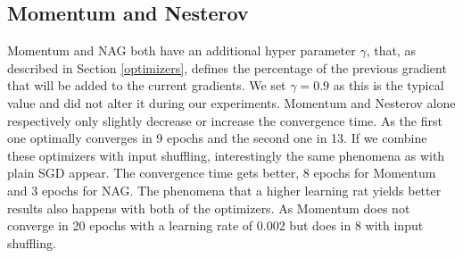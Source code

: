 \subsection{Momentum and Nesterov}
Momentum\cite{momentum} and NAG \cite{nag} both have an additional hyper parameter $\gamma$, that, as described in Section \ref{optimizers}, defines the percentage of the previous gradient that will be added to the current gradients. We set $\gamma = 0.9$ as this is the typical value and did not alter it during our experiments. Momentum and Nesterov alone respectively only slightly decrease or increase the convergence time. As the first one optimally converges in 9 epochs and the second one in 13. If we combine these optimizers with input shuffling, interestingly the same phenomena as with plain SGD appear. The convergence time gets better, 8 epochs for Momentum and 3 epochs for NAG. The phenomena that a higher learning rat yields better results also happens with both of the optimizers. As Momentum does not converge in 20 epochs with a learning rate of 0.002 but does in 8 with input shuffling. 

